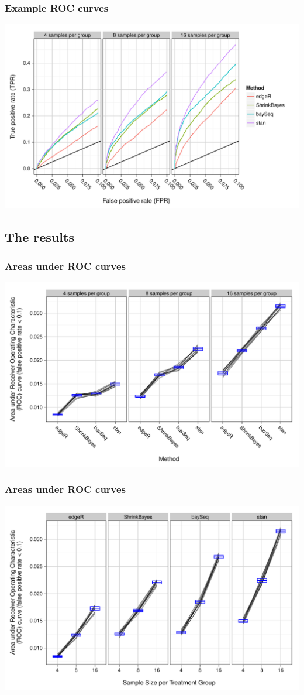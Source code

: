 \documentclass{beamer}
\numberwithin{equation}{section}
\begin{document}
\begin{frame}
\frametitle{Example ROC curves}
\begin{center}
\includegraphics[scale=0.5]{roc}
\end{center}
\end{frame}



\subsection{The results}

\begin{frame}
\frametitle{Areas under ROC curves}
\begin{center}
\includegraphics[scale=0.5]{auc1}
\end{center}
\end{frame}

\begin{frame}
\frametitle{Areas under ROC curves}
\begin{center}
\includegraphics[scale=0.5]{auc2}
\end{center}
\end{frame}
\end{document}
